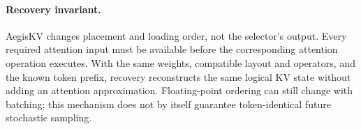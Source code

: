 \paragraph{Recovery invariant.}
AegisKV changes placement and loading order, not the selector's output.
Every required attention input must be available before the corresponding
attention operation executes. With the same weights, compatible layout
and operators, and the known token prefix, recovery reconstructs the
same logical KV state without adding an attention approximation.
Floating-point ordering can still change with batching; this mechanism
does not by itself guarantee token-identical future stochastic sampling.
